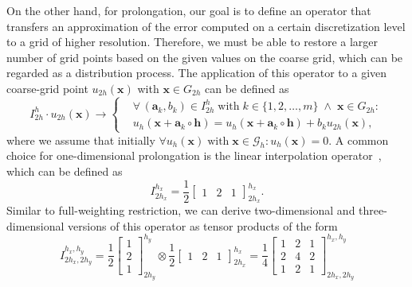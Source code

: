 On the other hand, for prolongation, our goal is to define an operator that transfers an approximation of the error computed on a certain discretization level to a grid of higher resolution.
Therefore, we must be able to restore a larger number of grid points based on the given values on the coarse grid, which can be regarded as a distribution process.
The application of this operator to a given coarse-grid point $u_{2h}(\bm{x})$ with $\bm{x} \in G_{2h}$ can be defined as
\begin{equation}
	I_{2h}^{h} \cdot u_{2h}(\bm{x}) \rightarrow
	\begin{cases}
		& \forall \, (\bm{a}_k, b_k) \in I_{2h}^{h} \; \text{with} \; k \in \{ 1, 2, \dots, m \} \; \wedge \; \bm{x} \in G_{2h} : \\
		& u_{h}(\bm{x} + \bm{a}_k \circ \bm{h}) = u_{h}(\bm{x} + \bm{a}_k \circ \bm{h}) + b_k u_{2h}(\bm{x}), 
	\end{cases}
	\label{eq:stencil-prolongation application}
\end{equation}
where we assume that initially $\forall u_h(\bm{x}) \; \text{with} \; \bm{x} \in \mathcal G_h : u_h(\bm{x}) = 0$.
A common choice for one-dimensional prolongation is the linear interpolation operator~\cite{trottenberg2000multigrid}, which can be defined as
\begin{equation}
	I_{2h_x}^{h_x} =  \frac{1}{2} \begin{bmatrix}
		1 & 2 & 1
	\end{bmatrix}_{2h_x}^{h_x}.
	\label{eq:linear-interpolation}
\end{equation}
Similar to full-weighting restriction, we can derive two-dimensional and three-dimensional versions of this operator as tensor products of the form
\begin{equation}
	I_{2h_x, 2h_y}^{h_x, h_y} = \frac{1}{2} \begin{bmatrix}
		1 \\ 2 \\ 1
	\end{bmatrix}_{2h_y}^{h_y} \otimes \frac{1}{2} \begin{bmatrix}
		1 & 2 & 1
	\end{bmatrix}_{2h_x}^{h_x} =
	\frac{1}{4} 
	\begin{bmatrix}
		1 & 2 & 1 \\
		2 & 4 & 2 \\
		1 & 2 & 1
	\end{bmatrix}_{2h_x, 2h_y}^{h_x, h_y}
\end{equation}
